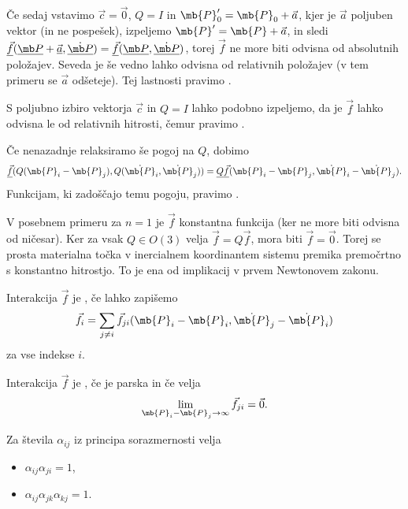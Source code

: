 Če sedaj vstavimo $\vec{c} = \vec{0}$, $Q = I$ in $\mb{P}_0' = \mb{P}_0 +
\vec{a}$, kjer je $\vec{a}$ poljuben vektor (in ne pospešek), izpeljemo
$\mb{P}' = \mb{P} + \vec{a}$, in sledi $\underline{\vec{f}}(\umb{P} +
\underline{\vec{a}}, \dot{\umb{P}}) = \underline{\vec{f}}(\umb{P},
\dot{\umb{P}})$, torej $\vec{f}$ ne more biti odvisna od absolutnih položajev.
Seveda je še vedno lahko odvisna od relativnih položajev (v tem primeru se
$\vec{a}$ odšeteje).
Tej lastnosti pravimo .

S poljubno izbiro vektorja $\vec{c}$ in $Q = I$ lahko podobno izpeljemo, da je
$\underline{\vec{f}}$ lahko odvisna le od relativnih hitrosti, čemur pravimo
.

Če nenazadnje relaksiramo še pogoj na $Q$, dobimo
\[
  \underline{\vec{f}}(Q(\mb{P}_i - \mb{P}_j), Q(\dot{\mb{P}}_i, \dot{\mb{P}}_j))
  = \underline{Q} \underline{\vec{f}}(\mb{P}_i - \mb{P}_j, \dot{\mb{P}}_i -
  \dot{\mb{P}}_j).
\]
Funkcijam, ki zadoščajo temu pogoju, pravimo .

V posebnem primeru za $n = 1$ je $\vec{f}$ konstantna funkcija (ker ne more biti
odvisna od ničesar).
Ker za vsak $Q \in O(3)$ velja $\vec{f} = Q \vec{f}$, mora biti $\vec{f} =
\vec{0}$.
Torej se prosta materialna točka v inercialnem koordinantem sistemu premika
premočrtno s konstantno hitrostjo.
To je ena od implikacij v prvem Newtonovem zakonu.


\begin{definicija}
  Interakcija $\vec{f}$ je , če lahko zapišemo
  \[
    \vec{f}_i = \sum_{j \ne i} \vec{f}_{ji}(\mb{P}_i - \mb{P}_i, \dot{\mb{P}}_j
    - \dot{\mb{P}}_i)
  \]
  za vse indekse $i$.
\end{definicija}

\begin{definicija}
  Interakcija $\vec{f}$ je , če je parska in če velja
  \[
    \lim_{\mb{P}_i - \mb{P}_j \to \infty} \vec{f}_{ji} = \vec{0}.
  \]
\end{definicija}


\begin{lema}
  Za števila $\alpha_{ij}$ iz principa sorazmernosti velja
  \begin{itemize}
  \item $\alpha_{ij} \alpha_{ji} = 1$,
  \item $\alpha_{ij} \alpha_{jk} \alpha_{kj} = 1$.
  \end{itemize}
\end{lema}

